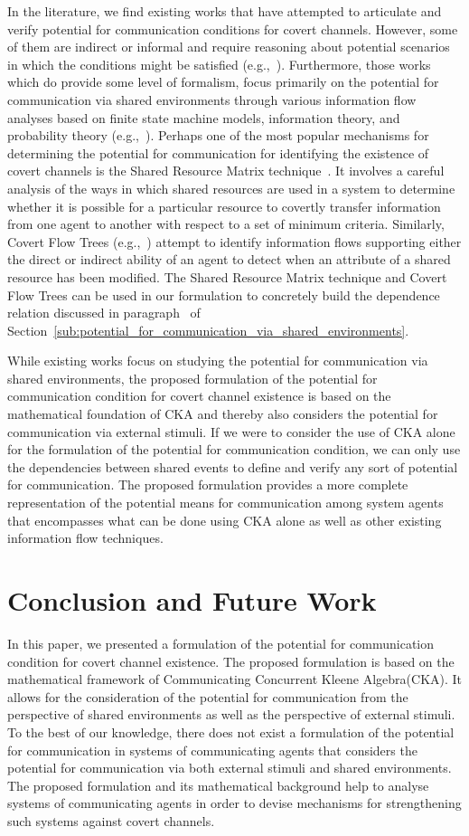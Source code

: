 \documentclass[copyright,creativecommons]{eptcs}
\makeatletter
\newcommand{\eg}{\textrm{e.g.,}\@\xspace}
\newcommand{\PFC}{potential for communication\@\xspace}
\newcommand{\socas}{systems of communicating agents\@\xspace}
\newcommand{\CKAabbrv}{CKA\@\xspace}
\newcommand{\CCKA}{Communicating Concurrent Kleene Algebra\@\xspace}
\newcommand{\CCKAabbrv}{CKA\@\xspace}
\makeatother
\begin{document}
In the literature, we find existing works that have attempted to articulate and verify potential for communication conditions for covert channels. However, some of them are indirect or informal and require reasoning about potential scenarios in which the conditions might be satisfied (\eg~\cite{Shieh1999aa}). Furthermore, those works which do provide some level of formalism, focus primarily on the potential for communication via shared environments through various information flow analyses based on finite state machine models, information theory, and probability theory (\eg~\cite{Gray1991aa,Johnson2010aa,Millen1989aa,Wang2005aa}). Perhaps one of the most popular mechanisms for determining the \PFC for identifying the existence of covert channels is the Shared Resource Matrix technique~\cite{Kemmerer1983aa}. It involves a careful analysis of the ways in which shared resources are used in a system to determine whether it is possible for a particular resource to covertly transfer information from one agent to another with respect to a set of minimum criteria. Similarly, Covert Flow Trees (\eg~\cite{Kemmerer1991aa}) attempt to identify information flows supporting either the direct or indirect ability of an agent to detect when an attribute of a shared resource has been modified. The Shared Resource Matrix technique and Covert Flow Trees can be used in our formulation to concretely build the dependence relation discussed in paragraph~ of Section~\ref{sub:potential_for_communication_via_shared_environments}.

While existing works focus on studying the potential for communication via shared environments, the proposed formulation of the \PFC condition for covert channel existence is based on the mathematical foundation of \CCKAabbrv and thereby also considers the potential for communication via external stimuli. If we were to consider the use of \CKAabbrv alone for the formulation of the \PFC condition, we can only use the dependencies between shared events to define and verify any sort of \PFC. The proposed formulation provides a more complete representation of the potential means for communication among system agents that encompasses what can be done using \CKAabbrv alone as well as other existing information flow techniques.  

\vspace{-0.15in}
\section{Conclusion and Future Work} 
\label{sec:conclusion_and_future_work}
\vspace{-0.1in}
In this paper, we presented a formulation of the \PFC condition for covert channel existence. The proposed formulation is based on the mathematical framework of \CCKA (\CCKAabbrv). It allows for the consideration of the \PFC from the perspective of shared environments as well as the perspective of external stimuli. To the best of our knowledge, there does not exist a formulation of the \PFC in \socas that considers the \PFC via both external stimuli and shared environments. The proposed formulation and its mathematical background help to analyse \socas in order to devise mechanisms for strengthening such systems against covert channels.
\end{document}
